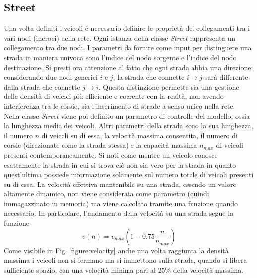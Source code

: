 \documentclass[../main.tex]{subfiles}
\begin{document}
\subsection{Street}
Una volta definiti i veicoli \'e necessario definire le proprietà dei collegamenti tra i vari nodi (incroci) della rete.
Ogni istanza della classe \emph{Street} rappresenta un collegamento tra due nodi.
I parametri da fornire come input per distinguere una strada in maniera univoca sono l'indice del nodo sorgente e l'indice del nodo destinazione.
Si presti ora attenzione al fatto che ogni strada abbia una direzione: considerando due nodi generici $i$ e $j$, la strada che connette $i\to j$ sarà differente dalla strada che connette $j \to i$.
Questa distinzione permette sia una gestione delle densità di veicoli più efficiente e coerente con la realtà, non avendo interferenza tra le corsie, sia l'inserimento di strade a senso unico nella rete.\\
Nella classe \emph{Street} viene poi definito un parametro di controllo del modello, ossia la lunghezza media dei veicoli.
Altri parametri della strada sono la sua lunghezza, il numero $n$ di veicoli su di essa, la velocità massima consentita, il numero di corsie (direzionate come la strada stessa) e la capacità massima $n_{max}$ di veicoli presenti contemporaneamente.
Si noti come mentre un veicolo conosce esattamente la strada in cui si trova ciò non sia vero per la strada in quanto quest'ultima possiede informazione solamente sul numero totale di veicoli presenti su di essa.
La velocità effettiva mantenibile su una strada, essendo un valore altamente dinamico, non viene considerata come parametro (quindi immagazzinato in memoria) ma viene calcolato tramite una funzione quando necessario.
In particolare, l'andamento della velocità su una strada segue la funzione
\begin{equation}
    v(n)=v_{max}\left(1-0.75\frac{n}{n_{max}}\right)
    \label{equation:velocity}
\end{equation}
Come visibile in Fig. \ref{figure:velocity} anche una volta raggiunta la densità massima i veicoli non si fermano ma si immettono sulla strada, quando si libera sufficiente spazio, con una velocità minima pari al $25\%$ della velocità massima.
\end{document}
